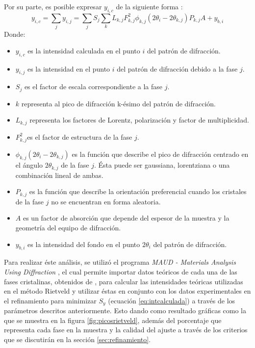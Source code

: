 \documentclass[../main.tex]{subfiles}
\begin{document}
Por su parte, es posible expresar $y_{i,c}$ de la siguiente forma \cite{Rietveld}:
\begin{equation}
    y_{i,c}=\sum_j y_{i,j}=\sum_{j}S_j\sum_{k}L_{k,j}F^2_{k,j}\phi_{k,j}\left(2\theta_i-2\theta_{k,j}\right)P_{k,j}A+y_{b,i}
    \label{eq:intcalculada}
\end{equation}
Donde:
\begin{itemize}
    \item $y_{i,c}$ es la intensidad calculada en el punto $i$ del patrón de difracción.
    \item $y_{i,j}$ es la intensidad en el punto $i$ del patrón de difracción debido a la fase $j$.
    \item $S_j$ es el factor de escala correspondiente a la fase $j$.
    \item $k$ representa al pico de difracción k-ésimo del patrón de difracción.
    \item $L_{k,j}$ representa los factores de Lorentz, polarización y factor de multiplicidad.
    \item $F^2_{k,j}$es el factor de estructura de la fase $j$.
    \item $\phi_{k,j}(2\theta_i-2\theta_{k,j})$ es la función que describe el pico de difracción centrado en el ángulo $2\theta_{k,j}$ de la fase $j$. Ésta puede ser gaussiana, lorentziana o una combinación lineal de ambas.
    \item $P_{k,j}$ es la función que describe la orientación preferencial cuando los cristales de la fase $j$ no se encuentran en forma aleatoria.
    \item $A$ es un factor de absorción que depende del espesor de la muestra y la geometría del equipo de difracción.
    \item $y_{b,i}$ es la intensidad del fondo en el punto $2\theta_i$ del patrón de difracción.
\end{itemize} 
Para realizar éste análisis, se utilizó el programa \textit{MAUD - Materials Analysis Using Diffraction} \cite{MAUD}, el cual permite importar datos teóricos de cada una de las fases cristalinas, obtenidos de \cite{COD}, para calcular las intensidades teóricas utilizadas en el método Rietveld y utilizar éstas en conjunto con los datos experimentales en el refinamiento para minimizar $S_y$ (ecuación \ref{eq:intcalculada}) a través de los parámetros descritos anteriormente. Esto dando como resultado gráficas como la que se muestra en la figura \ref{fig:picosrietveld}, además del porcentaje que representa cada fase en la muestra y la calidad del ajuste a través de los criterios que se discutirán en la sección \ref{sec:refinamiento}.
\end{document}
